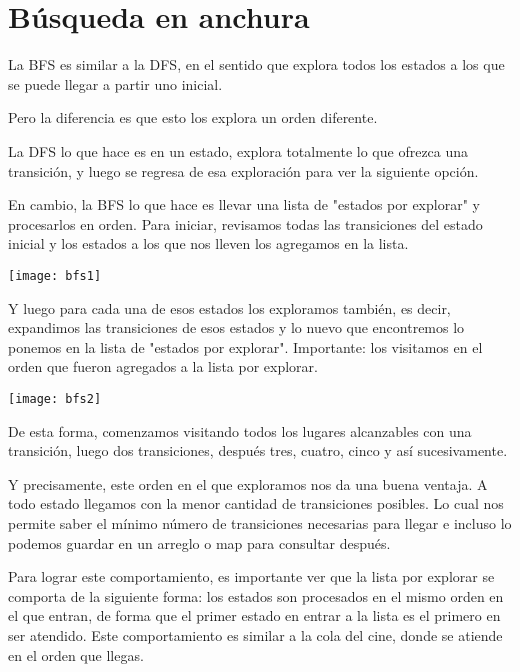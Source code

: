\chapter*{Búsqueda en anchura}

La BFS es similar a la DFS, en el sentido que explora todos los estados a los que se puede llegar a partir uno inicial.

Pero la diferencia es que esto los explora un orden diferente.

La DFS lo que hace es en un estado, explora totalmente lo que ofrezca una transición, y luego se regresa de esa exploración para ver la siguiente opción.

En cambio, la BFS lo que hace es llevar una lista de "estados por explorar" y procesarlos en orden. Para iniciar, revisamos todas las transiciones del estado inicial y los estados a los que nos lleven los agregamos en la lista.

\begin{center}
	\texttt{[image: bfs1]}
\end{center}

Y luego para cada una de esos estados los exploramos también, es decir, expandimos las transiciones de esos estados y lo nuevo que encontremos lo ponemos en la lista de "estados por explorar". Importante: los visitamos en el orden que fueron agregados a la lista por explorar.

\begin{center}
	\texttt{[image: bfs2]}
\end{center}

De esta forma, comenzamos visitando todos los lugares alcanzables con una transición, luego dos transiciones, después tres, cuatro, cinco y  así sucesivamente.

Y precisamente, este orden en el que exploramos nos da una buena ventaja. A todo estado llegamos con la menor cantidad de transiciones posibles. Lo cual nos permite saber el mínimo número de transiciones necesarias para llegar e incluso lo podemos guardar en un arreglo o map para consultar después.

Para lograr este comportamiento, es importante ver que la lista por explorar se comporta de la siguiente forma: los estados son procesados en el mismo orden en el que entran, de forma que el primer estado en entrar a la lista es el primero en ser atendido. Este comportamiento es similar a la cola del cine, donde se atiende en el orden que llegas.

